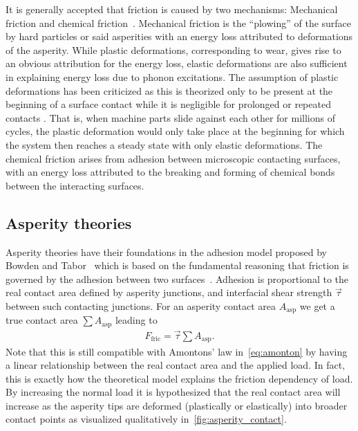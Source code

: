 It is generally accepted that friction is caused by two mechanisms: Mechanical
friction and chemical friction~\cite{kim_nano-scale_2009}. Mechanical
friction is the ``plowing'' of the surface by hard particles or said asperities
with an energy loss attributed to deformations of the asperity. While plastic
deformations, corresponding to wear, gives rise to an obvious attribution for
the energy loss, elastic deformations are also sufficient in explaining energy
loss due to phonon excitations. The assumption of plastic deformations
has been criticized as this is theorized only to be present at the beginning of
a surface contact while it is negligible for prolonged or repeated contacts
\cite{CARBONE20082555}. That is, when machine parts slide against each other for
millions of cycles, the plastic deformation would only take place at the beginning for which the system then reaches a steady state with only elastic deformations.
The chemical friction arises from adhesion between microscopic contacting
surfaces, with an energy loss attributed to the breaking and forming of chemical bonds between the interacting surfaces. 



\subsection{Asperity theories} %

Asperity theories have their foundations in the adhesion model proposed by Bowden and Tabor~\cite{bowden2001friction} which is based on the fundamental reasoning that friction is governed by the adhesion between two surfaces~\cite{Kim_2012}. Adhesion is proportional to the real contact area defined by asperity junctions, and interfacial shear strength $\vec{\tau}$ between such contacting junctions. For an asperity contact area $A_{\text{asp}}$ we get a true contact area $\sum A_{\text{asp}}$ leading to 
\begin{align*}
  F_\text{fric} = \vec{\tau} \sum A_{\text{asp}}.
\end{align*}
Note that this is still compatible with Amontons’ law in~\cref{eq:amonton} by having a linear relationship between the real contact area and the
applied load. In fact, this is exactly how the theoretical model explains the friction dependency of load. By increasing the normal load it is hypothesized that the real contact area will increase as the asperity tips are deformed (plastically or elastically) into broader contact points as visualized qualitatively in~\cref{fig:asperity_contact}.

